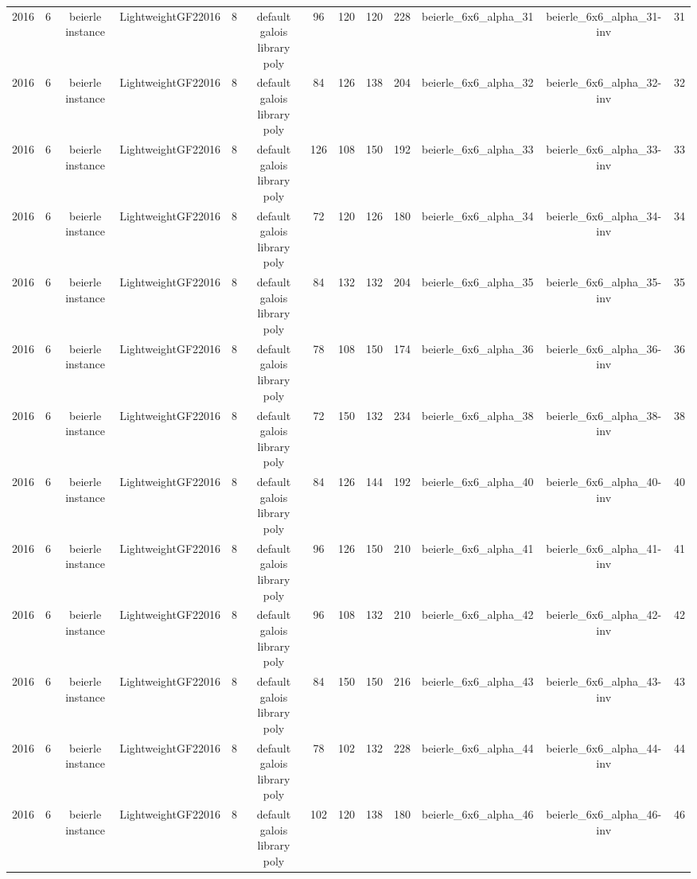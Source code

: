 \begin{tabular}{c c c c c c c c c c c c c}
2016 & 6 & beierle instance & LightweightGF22016 & 8 & default galois library poly & 96 & 120 & 120 & 228 & beierle_6x6_alpha_31 & beierle_6x6_alpha_31-inv & 31 \\
2016 & 6 & beierle instance & LightweightGF22016 & 8 & default galois library poly & 84 & 126 & 138 & 204 & beierle_6x6_alpha_32 & beierle_6x6_alpha_32-inv & 32 \\
2016 & 6 & beierle instance & LightweightGF22016 & 8 & default galois library poly & 126 & 108 & 150 & 192 & beierle_6x6_alpha_33 & beierle_6x6_alpha_33-inv & 33 \\
2016 & 6 & beierle instance & LightweightGF22016 & 8 & default galois library poly & 72 & 120 & 126 & 180 & beierle_6x6_alpha_34 & beierle_6x6_alpha_34-inv & 34 \\
2016 & 6 & beierle instance & LightweightGF22016 & 8 & default galois library poly & 84 & 132 & 132 & 204 & beierle_6x6_alpha_35 & beierle_6x6_alpha_35-inv & 35 \\
2016 & 6 & beierle instance & LightweightGF22016 & 8 & default galois library poly & 78 & 108 & 150 & 174 & beierle_6x6_alpha_36 & beierle_6x6_alpha_36-inv & 36 \\
2016 & 6 & beierle instance & LightweightGF22016 & 8 & default galois library poly & 72 & 150 & 132 & 234 & beierle_6x6_alpha_38 & beierle_6x6_alpha_38-inv & 38 \\
2016 & 6 & beierle instance & LightweightGF22016 & 8 & default galois library poly & 84 & 126 & 144 & 192 & beierle_6x6_alpha_40 & beierle_6x6_alpha_40-inv & 40 \\
2016 & 6 & beierle instance & LightweightGF22016 & 8 & default galois library poly & 96 & 126 & 150 & 210 & beierle_6x6_alpha_41 & beierle_6x6_alpha_41-inv & 41 \\
2016 & 6 & beierle instance & LightweightGF22016 & 8 & default galois library poly & 96 & 108 & 132 & 210 & beierle_6x6_alpha_42 & beierle_6x6_alpha_42-inv & 42 \\
2016 & 6 & beierle instance & LightweightGF22016 & 8 & default galois library poly & 84 & 150 & 150 & 216 & beierle_6x6_alpha_43 & beierle_6x6_alpha_43-inv & 43 \\
2016 & 6 & beierle instance & LightweightGF22016 & 8 & default galois library poly & 78 & 102 & 132 & 228 & beierle_6x6_alpha_44 & beierle_6x6_alpha_44-inv & 44 \\
2016 & 6 & beierle instance & LightweightGF22016 & 8 & default galois library poly & 102 & 120 & 138 & 180 & beierle_6x6_alpha_46 & beierle_6x6_alpha_46-inv & 46 \\

\end{tabular}
